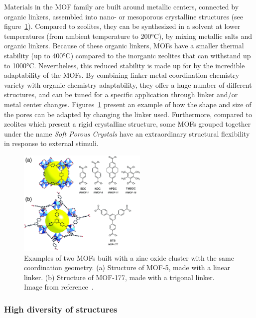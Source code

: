 \documentclass[thesis]{subfiles}
\begin{document}
Materials in the MOF family are built around metallic centers, connected by
organic linkers, assembled into nano- or mesoporous crystalline structures (see
figure~\ref{fig:mof-different-linkers}). Compared to zeolites, they can be
synthesized in a solvent at lower temperatures (from ambient temperature to
200°C), by mixing metallic salts and organic linkers. Because of these organic
linkers, MOFs have a smaller thermal stability (up to 400°C) compared to the
inorganic zeolites that can withstand up to 1000°C. Nevertheless, this reduced
stability is made up for by the incredible adaptability of the MOFs. By
combining linker-metal coordination chemistry variety with organic chemistry
adaptability, they offer a huge number of different structures, and can be tuned
for a specific application through linker and/or metal center changes.
Figures~\ref{fig:mof-different-linkers} present an example of how the shape and
size of the pores can be adapted by changing the linker used. Furthermore,
compared to zeolites which present a rigid crystalline structure, some MOFs
grouped together under the name \emph{Soft Porous Crystals}\cite{Horike2009}
have an extraordinary structural flexibility in response to external
stimuli\cite{Kitagawa2005, Bradshaw2005, Coudert2015}.

\begin{figure}[ht]
    \centering
    \includegraphics[width=0.55\textwidth]{figures/cited/mof-different-linker}
    \caption{Examples of two MOFs built with a zinc oxide cluster with the same
    coordination geometry. (a) Structure of MOF-5, made with a linear linker.
    (b) Structure of MOF-177, made with a trigonal linker. Image from
    reference~\cite{Rowsell2004}.}
    \label{fig:mof-different-linkers}
\end{figure}

\subsubsection{High diversity of structures}
\end{document}
